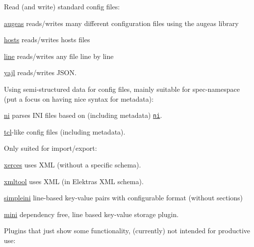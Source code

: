 Read (and write) standard config files\+:


\begin{DoxyItemize}
\item \hyperlink{md_src_plugins_augeas_README_src_plugins_augeas_README_md}{augeas} reads/writes many different configuration files using the augeas library
\item \hyperlink{md_src_plugins_hosts_README_src_plugins_hosts_README_md}{hosts} reads/writes hosts files
\item \hyperlink{md_src_plugins_line_README_src_plugins_line_README_md}{line} reads/writes any file line by line
\item \hyperlink{md_src_plugins_yajl_README_src_plugins_yajl_README_md}{yajl} reads/writes J\+S\+ON.
\end{DoxyItemize}

Using semi-\/structured data for config files, mainly suitable for spec-\/namespace (put a focus on having nice syntax for metadata)\+:


\begin{DoxyItemize}
\item \hyperlink{md_src_plugins_ni_README_src_plugins_ni_README_md}{ni} parses I\+NI files based on (including metadata) \href{https://github.com/chazomaticus/bohr/blob/master/include/bohr/ni.h}{\tt ni}.
\item \hyperlink{md_src_plugins_tcl_README_src_plugins_tcl_README_md}{tcl}-\/like config files (including metadata).
\end{DoxyItemize}

Only suited for import/export\+:


\begin{DoxyItemize}
\item \hyperlink{md_src_plugins_xerces_README_src_plugins_xerces_README_md}{xerces} uses X\+ML (without a specific schema).
\item \hyperlink{md_src_plugins_xmltool_README_src_plugins_xmltool_README_md}{xmltool} uses X\+ML (in Elektra\textquotesingle{}s X\+ML schema).
\item \hyperlink{md_src_plugins_simpleini_README_src_plugins_simpleini_README_md}{simpleini} line-\/based key-\/value pairs with configurable format (without sections)
\item \hyperlink{md_src_plugins_mini_README_src_plugins_mini_README_md}{mini} dependency free, line based key-\/value storage plugin.
\end{DoxyItemize}

Plugins that just show some functionality, (currently) not intended for productive use\+:


